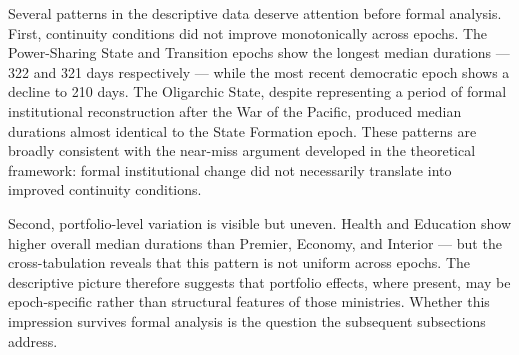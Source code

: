\documentclass[doc, 12pt, a4paper,floatsintext]{apa7}
\begin{document}
\begin{table}[!h]
\centering
\caption{\label{tab:crosstab_epoch_portfolio}Median Duration by Epoch and Portfolio (days)}
\centering
{}
\end{table}

Several patterns in the descriptive data deserve attention before 
formal analysis. First, continuity conditions did not improve 
monotonically across epochs. The Power-Sharing State and Transition 
epochs show the longest median durations --- 322 and 321 days 
respectively --- while the most recent democratic epoch shows a 
decline to 210 days. The Oligarchic State, despite representing a 
period of formal institutional reconstruction after the War of the 
Pacific, produced median durations almost identical to the State 
Formation epoch. These patterns are broadly consistent with the 
near-miss argument developed in the theoretical framework: formal 
institutional change did not necessarily translate into improved 
continuity conditions.

Second, portfolio-level variation is visible but uneven. Health and 
Education show higher overall median durations than Premier, Economy, 
and Interior --- but the cross-tabulation reveals that this pattern 
is not uniform across epochs. The descriptive picture therefore 
suggests that portfolio effects, where present, may be 
epoch-specific rather than structural features of those ministries. 
Whether this impression survives formal analysis is the question the 
subsequent subsections address.
\end{document}
